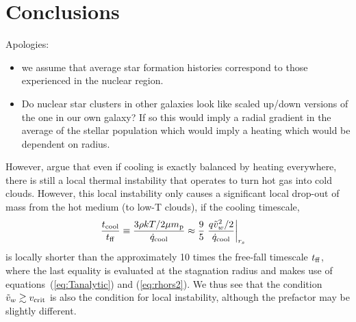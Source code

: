 \documentclass[usenatbib,fleqn]{mn2e}
\newcommand{\rs}{r_s}
\newcommand{\vw}{\tilde{v}_{w}}
\renewcommand{\mp}{m_{\rm p}}
\newcommand{\Mbh}[1][]{M_{\bullet#1}}
\newcommand{\rIa}{r_{\rm Ia}}
\newcommand{\vwO}{v_{w}}
\newcommand{\tcool}{t_{\rm cool}}
\newcommand{\tff}{t_{\rm ff}}
\begin{document}


\section{Conclusions}
\label{sec:conclusions}

Apologies: 
\begin{itemize}
\item{we assume that average star formation histories correspond to those experienced in the nuclear region.  }

\item{
Do nuclear star clusters in other galaxies look like scaled up/down versions of the one in our own galaxy? If so this would imply a radial gradient in the average of the stellar population which would imply a heating which would be dependent on radius.
}

\end{itemize}


However, \citet{McCourt+12} argue that even if cooling is exactly
balanced by heating everywhere, there is still a local thermal
instability that operates to turn hot gas into cold clouds.  However,
this local instability only causes a significant local drop-out of
mass from the hot medium (to low-T clouds), if the cooling timescale,
\begin{align}
\frac{\tcool}{\tff} &\equiv \frac{3\rho k T/2 \mu \mp}{\dot{q}_{\rm cool}} \approx \frac{9}{5} \left. \frac{q \vw^2/2}{\dot{q}_{\rm cool}}\right|_{\rs}
\end{align} 
is locally shorter than the approximately 10 times the free-fall
timescale $t_{\rm ff}$, where the last equality is evaluated at the
stagnation radius and makes use of equations~(\ref{eq:Tanalytic}) and
(\ref{eq:rhors2}).  We thus see that the condition $\tilde{v}_{w} \gtrsim v_{\rm
  crit}$ is also the condition for local instability, although the
prefactor may be slightly different.
\end{document}
